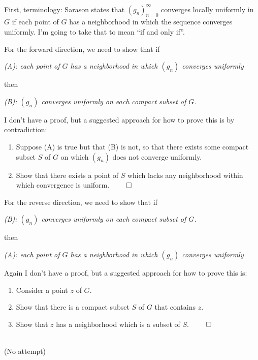 \documentclass[12pt]{article}
\begin{document}
\begin{description}

  \\\\
  First, terminology: Sarason states that $(g_n)_{n=0}^\infty$ converges
  locally uniformly in $G$ if each point of $G$ has a neighborhood in which the
  sequence converges uniformly. I'm going to take that to mean ``if and only if''.

  For the forward direction, we need to show that if

  \emph{(A): each point of $G$ has a neighborhood in which $(g_n)$ converges uniformly}

  then

  \emph{(B): $(g_n)$ converges uniformly on each compact subset of $G$.}

  I don't have a proof, but a suggested approach for how to prove this is by contradiction:
  \begin{enumerate}
  \item Suppose (A) is true but that (B) is not, so that there exists some
    compact subset $S$ of $G$ on which $(g_n)$ does not converge uniformly.
  \item Show that there exists a point of $S$ which lacks any neighborhood
    within which convergence is uniform. $\qed$
  \end{enumerate}

  For the reverse direction, we need to show that if

  \emph{(B): $(g_n)$ converges uniformly on each compact subset of $G$.}

  then

  \emph{(A): each point of $G$ has a neighborhood in which $(g_n)$ converges uniformly}

  Again I don't have a proof, but a suggested approach for how to prove this is:
  \begin{enumerate}
  \item Consider a point $z$ of $G$.
  \item Show that there is a compact subset $S$ of $G$ that contains $z$.
  \item Show that $z$ has a neighborhood which is a subset of $S$. $\qed$
  \end{enumerate}

\\
(No attempt)


\end{description}
\end{document}
